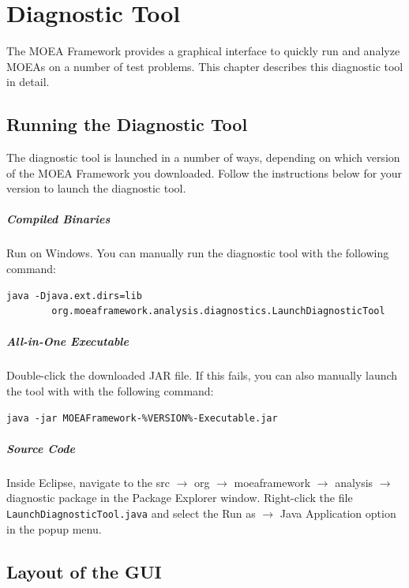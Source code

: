 \chapter{Diagnostic Tool}
The MOEA Framework provides a graphical interface to quickly run and analyze MOEAs on a number of test problems.  This chapter describes this diagnostic tool in detail.

\section{Running the Diagnostic Tool}
The diagnostic tool is launched in a number of ways, depending on which version of the MOEA Framework you downloaded.  Follow the instructions below for your version to launch the diagnostic tool.

\paragraph{Compiled Binaries}
Run  on Windows.  You can manually run the diagnostic tool with the following command:

\begin{lstlisting}[language=Plaintext]
java -Djava.ext.dirs=lib
		org.moeaframework.analysis.diagnostics.LaunchDiagnosticTool
\end{lstlisting}

\paragraph{All-in-One Executable}
Double-click the downloaded JAR file.  If this fails, you can also manually launch the tool with with the following command:

\begin{lstlisting}[language=Plaintext]
java -jar MOEAFramework-%VERSION%-Executable.jar
\end{lstlisting}

\paragraph{Source Code}
Inside Eclipse, navigate to the src $\rightarrow$ org $\rightarrow$ moeaframework $\rightarrow$ analysis $\rightarrow$ diagnostic package in the Package Explorer window.  Right-click the file \texttt{LaunchDiagnosticTool.java} and select the Run as $\rightarrow$ Java Application option in the popup menu.

\section{Layout of the GUI}

